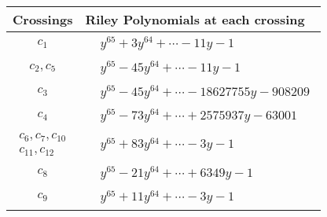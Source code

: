 \documentclass[1p]{elsarticle_modified}
\theoremstyle{definition}
\begin{document}
\begin{tabular}{m{50pt}|m{274pt}}
Crossings & \hspace{64pt}Riley Polynomials at each crossing \\
\hline $$\begin{aligned}c_{1}\end{aligned}$$&$\begin{aligned}
&y^{65}+3 y^{64}+\cdots-11 y-1
\end{aligned}$\\
\hline $$\begin{aligned}c_{2},c_{5}\end{aligned}$$&$\begin{aligned}
&y^{65}-45 y^{64}+\cdots-11 y-1
\end{aligned}$\\
\hline $$\begin{aligned}c_{3}\end{aligned}$$&$\begin{aligned}
&y^{65}-45 y^{64}+\cdots-18627755 y-908209
\end{aligned}$\\
\hline $$\begin{aligned}c_{4}\end{aligned}$$&$\begin{aligned}
&y^{65}-73 y^{64}+\cdots+2575937 y-63001
\end{aligned}$\\
\hline $$\begin{aligned}c_{6},c_{7},c_{10}\\c_{11},c_{12}\end{aligned}$$&$\begin{aligned}
&y^{65}+83 y^{64}+\cdots-3 y-1
\end{aligned}$\\
\hline $$\begin{aligned}c_{8}\end{aligned}$$&$\begin{aligned}
&y^{65}-21 y^{64}+\cdots+6349 y-1
\end{aligned}$\\
\hline $$\begin{aligned}c_{9}\end{aligned}$$&$\begin{aligned}
&y^{65}+11 y^{64}+\cdots-3 y-1
\end{aligned}$\\
\hline
\end{tabular}
\vskip 2pc
\end{document}
